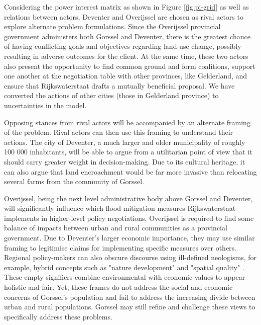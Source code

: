 \bigskip 
\noindent Considering the power interest matrix as shown in Figure \ref{fig:pi-grid} as well as relations between actors, Deventer and Overijssel are chosen as rival actors to explore alternate problem formulations. Since the Overijssel provincial government administers both Gorssel and Deventer, there is the greatest chance of having conflicting goals and objectives regarding land-use change, possibly resulting in adverse outcomes for the client. At the same time, these two actors also present the opportunity to find common ground and form coalitions, support one another at the negotiation table with other provinces, like Gelderland, and ensure that Rijkswaterstaat drafts a mutually beneficial proposal. We have converted the actions of other cities (those in Gelderland province) to uncertainties in the model.

\bigskip 

\noindent Opposing stances from rival actors will be accompanied by an alternate framing of the problem. Rival actors can then use this framing to understand their actions. The city of Deventer, a much larger and older municipality of roughly 100 000 inhabitants, will be able to argue from a utilitarian point of view that it should carry greater weight in decision-making. Due to its cultural heritage, it can also argue that land encroachment would be far more invasive than relocating several farms from the community of Gorssel. 

Overijssel, being the next level administrative body above Gorssel and Deventer, will significantly influence which flood mitigation measures Rijkswaterstaat implements in higher-level policy negotiations. Overijssel is required to find some balance of impacts between urban and rural communities as a provincial government. Due to Deventer's larger economic importance, they may use similar framing to legitimise claims for implementing specific measures over others. Regional policy-makers can also obscure discourse using ill-defined neologisms, for example, hybrid concepts such as "nature development" and "spatial quality" \parencite{warner_implementing_2011}. These empty signifiers combine environmental with economic values to appear holistic and fair. Yet, these frames do not address the social and economic concerns of Gorssel's population and fail to address the increasing divide between urban and rural populations. Gorssel may still refine and challenge these views to specifically address these problems.

